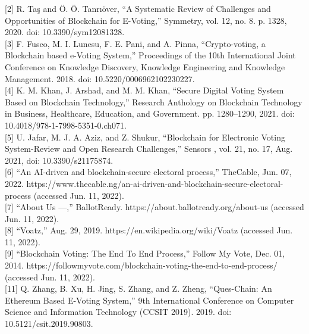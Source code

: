 \documentclass[a4paper,12pt]{report}
\begin{document}
[2]	R. Taş and Ö. Ö. Tanrıöver, “A Systematic Review of Challenges and Opportunities of Blockchain for E-Voting,” Symmetry, vol. 12, no. 8. p. 1328, 2020. doi: 10.3390/sym12081328.\\

[3]	F. Fusco, M. I. Lunesu, F. E. Pani, and A. Pinna, “Crypto-voting, a Blockchain based e-Voting System,” Proceedings of the 10th International Joint Conference on Knowledge Discovery, Knowledge Engineering and Knowledge Management. 2018. doi: 10.5220/0006962102230227.\\

[4]	K. M. Khan, J. Arshad, and M. M. Khan, “Secure Digital Voting System Based on Blockchain Technology,” Research Anthology on Blockchain Technology in Business, Healthcare, Education, and Government. pp. 1280–1290, 2021. doi: 10.4018/978-1-7998-5351-0.ch071.\\

[5]	U. Jafar, M. J. A. Aziz, and Z. Shukur, “Blockchain for Electronic Voting System-Review and Open Research Challenges,” Sensors , vol. 21, no. 17, Aug. 2021, doi: 10.3390/s21175874.\\

[6]	“An AI-driven and blockchain-secure electoral process,” TheCable, Jun. 07, 2022. https://www.thecable.ng/an-ai-driven-and-blockchain-secure-electoral-process (accessed Jun. 11, 2022).\\

[7]	“About Us —,” BallotReady. https://about.ballotready.org/about-us (accessed Jun. 11, 2022).\\

[8]	“Voatz,” Aug. 29, 2019. https://en.wikipedia.org/wiki/Voatz (accessed Jun. 11, 2022).\\

[9]	“Blockchain Voting: The End To End Process,” Follow My Vote, Dec. 01, 2014. https://followmyvote.com/blockchain-voting-the-end-to-end-process/ (accessed Jun. 11, 2022).\\




[11]	Q. Zhang, B. Xu, H. Jing, S. Zhang, and Z. Zheng, “Ques-Chain: An Ethereum Based E-Voting System,” 9th International Conference on Computer Science and Information Technology (CCSIT 2019). 2019. doi: 10.5121/csit.2019.90803.\\
\end{document}
